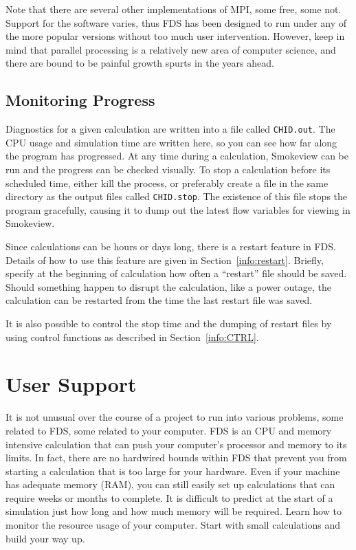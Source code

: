 \documentclass[11pt]{book}
\newcommand{\ct}{\tt\small}
\begin{document}
\begin{warning}
\noindent
Note that there are several other implementations of MPI, some free, some not.
Support for the software varies, thus FDS has been designed to run under any of the
more popular versions without too much user intervention. However, keep in mind
that parallel processing is a relatively new area of computer science,
and there are bound to be painful growth spurts in the years ahead.
\end{warning}

\newpage

\section{Monitoring Progress}

Diagnostics for a given calculation are written into a file called {\ct CHID.out}.
The CPU usage and simulation time are written here, so you can see how
far along the program has progressed. At any time during a calculation,
Smokeview can be run and the progress can be checked visually.
To stop a calculation before its scheduled time, either
kill the process, or preferably create a file in the same directory as
the output files called {\ct CHID.stop}. The existence of this
file stops the program gracefully, causing it to dump out the
latest flow variables for viewing in Smokeview.

Since calculations can be hours or days long, there is a restart
feature in FDS. Details of how to use this feature
are given in Section~\ref{info:restart}. Briefly, specify at the
beginning of calculation how often a ``restart'' file should be saved.
Should something happen to disrupt the calculation, like a power
outage, the calculation can be restarted from the time the last restart
file was saved.

It is also possible to control the stop time and the dumping of restart files by using
control functions as described in Section~\ref{info:CTRL}.



\chapter{User Support}

It is not unusual over the course of a
project to run into various problems, some related to FDS, some related to your computer.
FDS is an CPU and memory intensive calculation that can push your computer's
processor and memory to its limits. In fact, there are no hardwired bounds within FDS that
prevent you from starting a calculation that is too large for your hardware.
Even if your machine has adequate memory (RAM), you can still easily set up calculations that can require
weeks or months to complete. It is difficult to predict at the start of a simulation just how long and
how much memory will be required. Learn how to monitor the resource usage of your computer.
Start with small calculations and build your way up.
\end{document}
